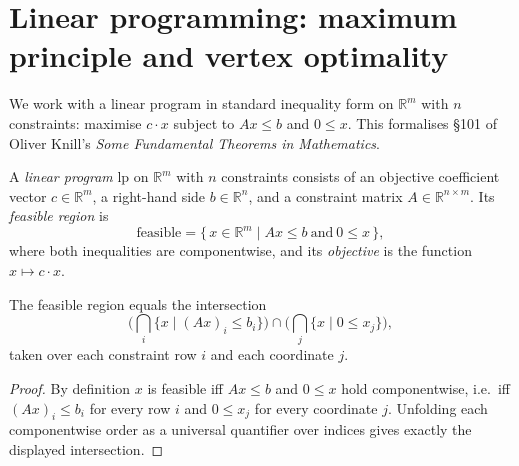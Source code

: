 \section{Linear programming: maximum principle and vertex optimality}

We work with a linear program in standard inequality form on $\mathbb{R}^m$ with
$n$ constraints: maximise $c \cdot x$ subject to $A x \le b$ and $0 \le x$.
This formalises \S101 of Oliver Knill's \emph{Some Fundamental Theorems in
Mathematics}.

\begin{definition}
    \label{def:linear-program}
    A \emph{linear program} $\mathrm{lp}$ on $\mathbb{R}^m$ with $n$ constraints
    consists of an objective coefficient vector $c \in \mathbb{R}^m$, a
    right-hand side $b \in \mathbb{R}^n$, and a constraint matrix
    $A \in \mathbb{R}^{n \times m}$. Its \emph{feasible region} is
    \[
        \mathrm{feasible} = \{\, x \in \mathbb{R}^m \mid A x \le b \ \text{and}\ 0 \le x \,\},
    \]
    where both inequalities are componentwise, and its \emph{objective} is the
    function $x \mapsto c \cdot x$.
\end{definition}

\begin{lemma}
    \label{lem:feasible-as-inter}
    \leanok
    The feasible region equals the intersection
    \[
        \Big(\bigcap_{i} \{x \mid (A x)_i \le b_i\}\Big)
        \cap
        \Big(\bigcap_{j} \{x \mid 0 \le x_j\}\Big),
    \]
    taken over each constraint row $i$ and each coordinate $j$.
\end{lemma}
\begin{proof}
    By definition $x$ is feasible iff $A x \le b$ and $0 \le x$ hold
    componentwise, i.e.\ iff $(A x)_i \le b_i$ for every row $i$ and $0 \le x_j$
    for every coordinate $j$. Unfolding each componentwise order as a universal
    quantifier over indices gives exactly the displayed intersection.
\end{proof}


